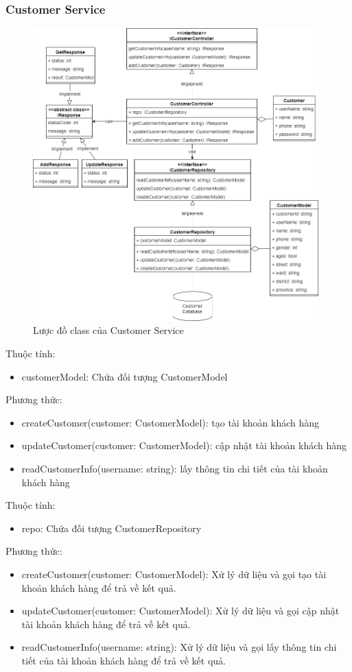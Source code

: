 \subsubsection{Customer Service}
\begin{figure}[!htp]
	\centering
	\includegraphics[width=11cm]{img/Architecture/service/CustomerService.png}
	\newline
	\caption{Lược đồ class của Customer Service}
\end{figure}

Thuộc tính:
\begin{itemize}
	\item customerModel: Chứa đối tượng CustomerModel
\end{itemize}
Phương thức:
\begin{itemize}
	\item createCustomer(customer: CustomerModel): tạo tài khoản khách hàng
	\item updateCustomer(customer: CustomerModel): cập nhật tài khoản khách hàng
	\item readCustomerInfo(username: string): lấy thông tin chi tiết của tài khoản khách hàng
\end{itemize}

Thuộc tính:
\begin{itemize}
	\item repo: Chứa đối tượng CustomerRepository
\end{itemize}
Phương thức:
\begin{itemize}
	\item createCustomer(customer: CustomerModel): Xử lý dữ liệu và gọi tạo tài khoản khách hàng để trả về kết quả.
	\item updateCustomer(customer: CustomerModel): Xử lý dữ liệu và gọi cập nhật tài khoản khách hàng để trả về kết quả.
	\item readCustomerInfo(username: string): Xử lý dữ liệu và gọi lấy thông tin chi tiết của tài khoản khách hàng để trả về kết quả.
\end{itemize}

